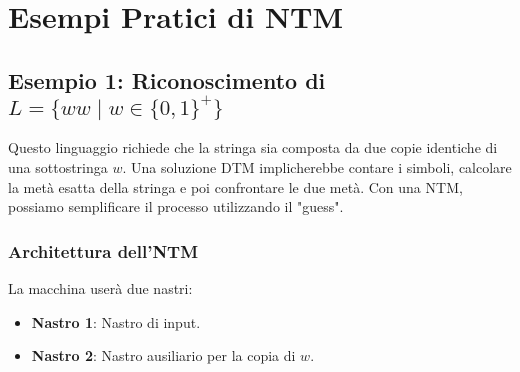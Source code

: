 \documentclass[a4paper]{article}
\begin{document}
\section{Esempi Pratici di NTM}

\subsection{Esempio 1: Riconoscimento di $L = \{ww \mid w \in \{0,1\}^+\}$}
Questo linguaggio richiede che la stringa sia composta da due copie identiche di una sottostringa $w$. Una soluzione DTM implicherebbe contare i simboli, calcolare la metà esatta della stringa e poi confrontare le due metà. Con una NTM, possiamo semplificare il processo utilizzando il "guess".

\subsubsection{Architettura dell'NTM}
La macchina userà due nastri:
\begin{itemize}
    \item \textbf{Nastro 1}: Nastro di input.
    \item \textbf{Nastro 2}: Nastro ausiliario per la copia di $w$.
\end{itemize}
\end{document}
